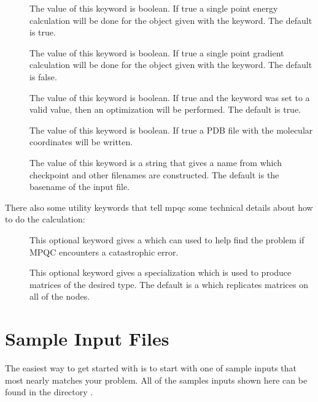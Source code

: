 \begin{description}
\item[] The value of this keyword is boolean.  If
        true a single point energy calculation will be done for the
         object given with the 
        keyword.  The default is true.
\item[] The value of this keyword is boolean.  If
        true a single point gradient calculation will be done for the
         object given with the 
        keyword.  The default is false.
\item[] The value of this keyword is boolean.  If
        true and the  keyword was set to a valid value,
        then an optimization will be performed.  The default is true.
\item[] The value of this keyword is boolean.  If
        true a PDB file with the molecular coordinates will be written.
\item[] The value of this keyword is a string that
        gives a name from which checkpoint and other filenames are
        constructed.  The default is the basename of the input file.
\end{description}

There also some utility keywords that tell mpqc some technical
details about how to do the calculation:
\begin{description}
\item[] This optional keyword gives a 
         which can used to help find the problem
        if MPQC encounters a catastrophic error.
\item[]
        This optional keyword gives a  specialization
        which is used to produce matrices of the desired type.
        The default is a  which replicates
        matrices on all of the nodes.
\end{description}



\section{Sample Input Files}

The easiest way to get started with  is to start with
one of sample inputs that most nearly matches your problem.  All
of the samples inputs shown here can be found in the directory
.

